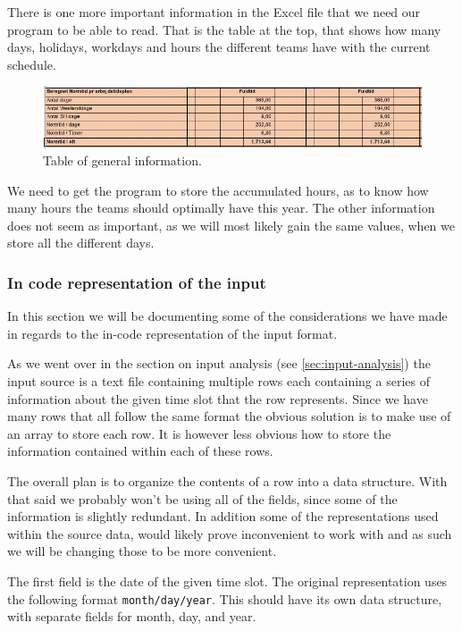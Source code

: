 There is one more important information in the Excel file that we need our program to be able to read. That is the table at the top, that shows how many days, holidays, workdays and hours the different teams have with the current schedule.
 
\begin{figure}[ht!]
    \centering
    \includegraphics[width=\textwidth]{media/Table P2.JPG}
    \caption{Table of general information.}
    \label{fig:Table_information}
\end{figure}

We need to get the program to store the accumulated hours, as to know how many hours the teams should optimally have this year. The other information does not seem as important, as we will most likely gain the same values, when we store all the different days.


\subsubsection{In code representation of the input}
In this section we will be documenting some of the considerations we have made in regards to the in-code representation of the input format.

As we went over in the section on input analysis (see \ref{sec:input-analysis}) the input source is a text file containing multiple rows each containing a series of information about the given time slot that the row represents. Since we have many rows that all follow the same format the obvious solution is to make use of an array to store each row. It is however less obvious how to store the information contained within each of these rows.

The overall plan is to organize the contents of a row into a data structure. With that said we probably won't be using all of the fields, since some of the information is slightly redundant. In addition some of the representations used within the source data, would likely prove inconvenient to work with and as such we will be changing those to be more convenient.

The first field is the date of the given time slot. The original representation uses the following format \verb|month/day/year|. This should have its own data structure, with separate fields for month, day, and year.

